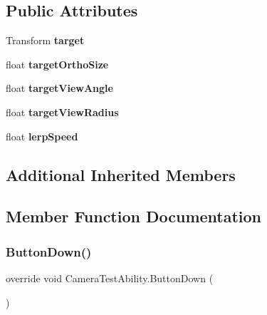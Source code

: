 \subsection*{Public Attributes}
\begin{DoxyCompactItemize}
\item 
\hypertarget{class_camera_test_ability_a29d763143c6d4be2df7796bcb6dffd60}{}\label{class_camera_test_ability_a29d763143c6d4be2df7796bcb6dffd60} 
Transform {\bfseries target}
\item 
\hypertarget{class_camera_test_ability_a3882d52ab0661973e044c4bcbb447082}{}\label{class_camera_test_ability_a3882d52ab0661973e044c4bcbb447082} 
float {\bfseries target\+Ortho\+Size}
\item 
\hypertarget{class_camera_test_ability_af7bb52d12b52e445df775667ba2d0fce}{}\label{class_camera_test_ability_af7bb52d12b52e445df775667ba2d0fce} 
float {\bfseries target\+View\+Angle}
\item 
\hypertarget{class_camera_test_ability_a84b42bb1bd436fb6e467cfb1bfb743a7}{}\label{class_camera_test_ability_a84b42bb1bd436fb6e467cfb1bfb743a7} 
float {\bfseries target\+View\+Radius}
\item 
\hypertarget{class_camera_test_ability_ad4a3364984769d8daf4b6035bd8776ee}{}\label{class_camera_test_ability_ad4a3364984769d8daf4b6035bd8776ee} 
float {\bfseries lerp\+Speed}
\end{DoxyCompactItemize}
\subsection*{Additional Inherited Members}


\subsection{Member Function Documentation}
\hypertarget{class_camera_test_ability_a27225856d48b83c5b86d2ebdfbd401d1}{}\label{class_camera_test_ability_a27225856d48b83c5b86d2ebdfbd401d1} 
\subsubsection{\texorpdfstring{Button\+Down()}{ButtonDown()}}
{\footnotesize\ttfamily override void Camera\+Test\+Ability.\+Button\+Down (\begin{DoxyParamCaption}{ }\end{DoxyParamCaption})\hspace{0.3cm}{\ttfamily [virtual]}}



